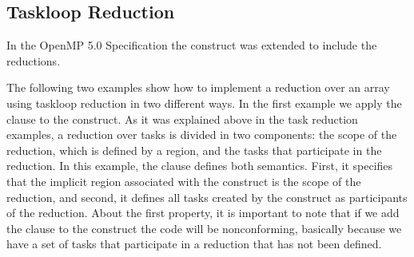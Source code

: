

\subsection{Taskloop Reduction}
\label{subsec:taskloop_reduction}

In the OpenMP 5.0 Specification the  construct
was extended to include the reductions.

The following two examples show how to implement a reduction over an array
using taskloop reduction in two different ways.
In the first
example we apply the  clause to the  construct. As it was
explained above in the task reduction examples, a reduction over tasks is
divided in two components: the scope of the reduction, which is defined by a
 region, and the tasks that participate in the reduction. In this
example, the  clause defines both semantics. First, it specifies that
the implicit  region associated with the  construct is the scope of the
reduction, and second, it defines all tasks created by the  construct as
participants of the reduction. About the first property, it is important to note
that if we add the  clause to the  construct the code will be
nonconforming, basically because we have a set of tasks that participate in a
reduction that has not been defined.



